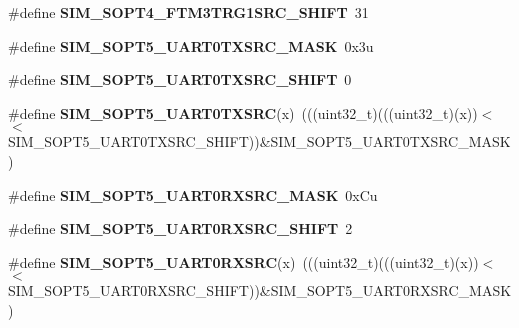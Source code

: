 \begin{DoxyCompactItemize}
\item 
\#define {\bfseries S\+I\+M\+\_\+\+S\+O\+P\+T4\+\_\+\+F\+T\+M3\+T\+R\+G1\+S\+R\+C\+\_\+\+S\+H\+I\+FT}~31\hypertarget{group__SIM__Register__Masks_ga837c289419ec9b1924a8fd50f6afef5c}{}\label{group__SIM__Register__Masks_ga837c289419ec9b1924a8fd50f6afef5c}

\item 
\#define {\bfseries S\+I\+M\+\_\+\+S\+O\+P\+T5\+\_\+\+U\+A\+R\+T0\+T\+X\+S\+R\+C\+\_\+\+M\+A\+SK}~0x3u\hypertarget{group__SIM__Register__Masks_ga11646c1292cb7aab3128e1e563847e32}{}\label{group__SIM__Register__Masks_ga11646c1292cb7aab3128e1e563847e32}

\item 
\#define {\bfseries S\+I\+M\+\_\+\+S\+O\+P\+T5\+\_\+\+U\+A\+R\+T0\+T\+X\+S\+R\+C\+\_\+\+S\+H\+I\+FT}~0\hypertarget{group__SIM__Register__Masks_ga0220b88df4a0747579d24b77f4db4e67}{}\label{group__SIM__Register__Masks_ga0220b88df4a0747579d24b77f4db4e67}

\item 
\#define {\bfseries S\+I\+M\+\_\+\+S\+O\+P\+T5\+\_\+\+U\+A\+R\+T0\+T\+X\+S\+RC}(x)~(((uint32\+\_\+t)(((uint32\+\_\+t)(x))$<$$<$S\+I\+M\+\_\+\+S\+O\+P\+T5\+\_\+\+U\+A\+R\+T0\+T\+X\+S\+R\+C\+\_\+\+S\+H\+I\+FT))\&S\+I\+M\+\_\+\+S\+O\+P\+T5\+\_\+\+U\+A\+R\+T0\+T\+X\+S\+R\+C\+\_\+\+M\+A\+SK)\hypertarget{group__SIM__Register__Masks_ga65e932e39703b2b18dea82ca440fc68f}{}\label{group__SIM__Register__Masks_ga65e932e39703b2b18dea82ca440fc68f}

\item 
\#define {\bfseries S\+I\+M\+\_\+\+S\+O\+P\+T5\+\_\+\+U\+A\+R\+T0\+R\+X\+S\+R\+C\+\_\+\+M\+A\+SK}~0x\+Cu\hypertarget{group__SIM__Register__Masks_ga6160de3cd4b7169ac9095c0d0eee46f7}{}\label{group__SIM__Register__Masks_ga6160de3cd4b7169ac9095c0d0eee46f7}

\item 
\#define {\bfseries S\+I\+M\+\_\+\+S\+O\+P\+T5\+\_\+\+U\+A\+R\+T0\+R\+X\+S\+R\+C\+\_\+\+S\+H\+I\+FT}~2\hypertarget{group__SIM__Register__Masks_ga27e87f2f792b880bd156907ab20e9910}{}\label{group__SIM__Register__Masks_ga27e87f2f792b880bd156907ab20e9910}

\item 
\#define {\bfseries S\+I\+M\+\_\+\+S\+O\+P\+T5\+\_\+\+U\+A\+R\+T0\+R\+X\+S\+RC}(x)~(((uint32\+\_\+t)(((uint32\+\_\+t)(x))$<$$<$S\+I\+M\+\_\+\+S\+O\+P\+T5\+\_\+\+U\+A\+R\+T0\+R\+X\+S\+R\+C\+\_\+\+S\+H\+I\+FT))\&S\+I\+M\+\_\+\+S\+O\+P\+T5\+\_\+\+U\+A\+R\+T0\+R\+X\+S\+R\+C\+\_\+\+M\+A\+SK)\hypertarget{group__SIM__Register__Masks_ga90e650c4ec5da3b971b3acdf511c466a}{}\label{group__SIM__Register__Masks_ga90e650c4ec5da3b971b3acdf511c466a}


\end{DoxyCompactItemize}
